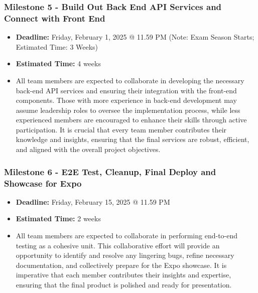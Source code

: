 \documentclass{article}
\begin{document}
\subsubsection*{Milestone 5 - Build Out Back End API Services and Connect with Front End}
\begin{itemize}
    \item \textbf{Deadline:} Friday, February 1, 2025 @ 11.59 PM (Note: Exam
    Season Starts; Estimated Time: 3 Weeks)
    \item \textbf{Estimated Time:} 4 weeks
    \item All team members are expected to collaborate in developing the
    necessary back-end API services and ensuring their integration with the
    front-end components. Those with more experience in back-end development may
    assume leadership roles to oversee the implementation process, while less
    experienced members are encouraged to enhance their skills through active
    participation. It is crucial that every team member contributes their
    knowledge and insights, ensuring that the final services are robust,
    efficient, and aligned with the overall project objectives.
\end{itemize}

\subsubsection*{Milestone 6 - E2E Test, Cleanup, Final Deploy and Showcase for Expo}
\begin{itemize}
    \item \textbf{Deadline:} Friday, February 15, 2025 @ 11.59 PM
    \item \textbf{Estimated Time:} 2 weeks
    \item All team members are expected to collaborate in performing end-to-end
    testing as a cohesive unit. This collaborative effort will provide an
    opportunity to identify and resolve any lingering bugs, refine necessary
    documentation, and collectively prepare for the Expo showcase. It is
    imperative that each member contributes their insights and expertise,
    ensuring that the final product is polished and ready for presentation.
\end{itemize}
\end{document}
